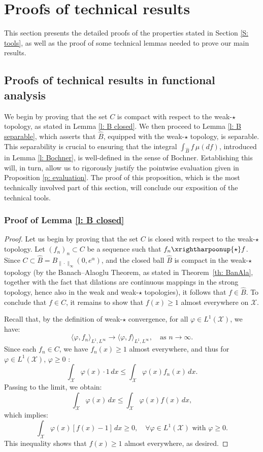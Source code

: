 \documentclass[a4paper, 11pt]{article}
\theoremstyle{definition}
\newcommand{\cX}{{\mathcal{X}}}
\newcommand{\theconvex}{C}
\begin{document}
{\section{Proofs of technical results}{\label{s: proof technical}}
This section presents the detailed proofs of the properties stated in Section \ref{S: tools}, as well as the proof of some technical lemmas needed to prove our main results.
\subsection{Proofs of technical results in functional analysis}
We begin by proving that the set $\theconvex$ is compact with respect to the weak-$\star$ topology, as stated in Lemma \ref{l: B closed}. We then proceed to Lemma \ref{l: B separable}, which asserts that $\widehat{B}$, equipped with the weak-$\star$ topology, is separable. This separability is crucial to ensuring that the integral $\int_{\widehat{B}} f \, \mu(df)$, introduced in Lemma \ref{l: Bochner}, is well-defined in the sense of Bochner. Establishing this will, in turn, allow us to rigorously justify the pointwise evaluation given in Proposition \ref{p: evaluation}. The proof of this proposition, which is the most technically involved part of this section, will conclude our exposition of the technical tools.


\subsubsection{Proof of Lemma \ref{l: B closed}}
\begin{proof}
Let us begin by proving that the set \( \theconvex \) is closed with respect to the weak-\(\star\) topology. Let \( (f_n)_n \subset C \) be a sequence such that \( f_n \xrightharpoonup{\star} f \). Since \( C \subset \widehat{B}=B_{\|\cdot\|_\infty}(0, e^{\alpha}) \), and the closed ball $\widehat{B}$ %
is compact in the weak-\(\star\) topology (by the Banach–Alaoglu Theorem, as stated in Theorem~\ref{th: BanAla}, together with the fact that dilations are continuous mappings in the strong topology, hence also in the weak and weak-\(\star\) topologies), it follows that $ f \in \widehat{B}$. %
To conclude that \( f \in \theconvex \), it remains to show that \( f(x) \geq 1 \) almost everywhere on \( \mathcal{X} \). 

Recall that, by the definition of weak-\(\star\) convergence, for all \( \varphi \in L^1(\mathcal{X}) \), we have:
\[
\langle \varphi, f_n \rangle_{L^1, L^\infty} \longrightarrow \langle \varphi, f \rangle_{L^1, L^\infty}, \quad \text{as } n \to \infty.
\]
Since each \( f_n \in \theconvex \), we have \( f_n(x) \geq 1 \) almost everywhere, and thus for $\varphi \in L^1(\cX)$, $\varphi \ge0$ :
\[
\int_{\mathcal{X}} \varphi(x) \cdot 1 \, dx \leq \int_{\mathcal{X}} \varphi(x) f_n(x) \, dx.
\]
Passing to the limit, we obtain:
\[
\int_{\mathcal{X}} \varphi(x) \, dx \leq \int_{\mathcal{X}} \varphi(x) f(x) \, dx,
\]
which implies:
\[
\int_{\mathcal{X}} \varphi(x) [f(x) - 1] \, dx \geq 0, \quad \forall \varphi \in L^1(\mathcal{X}) \text{ with $\varphi \ge 0$.}
\]
This inequality shows that \( f(x) \geq 1 \) almost everywhere, as desired.


\end{proof}}
\end{document}
